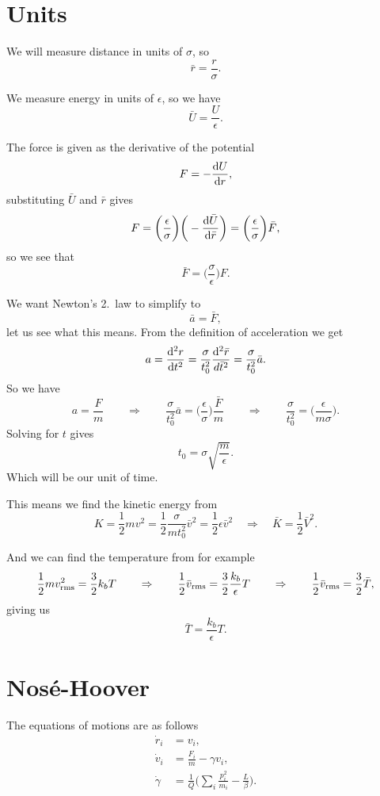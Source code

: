 \documentclass[a4paper, 11pt, notitlepage, english]{article}
\renewcommand{\d}{{\rm d}}
\newcommand{\To}{\quad\Rightarrow\quad}
\newcommand{\eps}{\epsilon}
\begin{document}
\section*{Units}

We will measure distance in units of $\sigma$, so
$$\bar{r} = \frac{r}{\sigma}.$$

We measure energy in units of $\eps$, so we have
$$\bar{U} = \frac{U}{\eps}.$$

The force is given as the derivative of the potential
$$F = -\frac{\d U}{\d r},$$
substituting $\bar U$ and $\bar r$ gives
$$F = \bigg(\frac{\eps}{\sigma}\bigg)\bigg(-\frac{\d \bar{U}}{\d \bar{r}}\bigg) = \bigg(\frac{\eps}{\sigma}\bigg)\bar{F},$$
so we see that
$$\bar{F} = \bigg(\frac{\sigma}{\eps}\bigg)F.$$

We want Newton's 2.\ law to simplify to
$$\bar{a} = \bar{F},$$
let us see what this means. From the definition of acceleration we get
$$a = \frac{\d^2 r}{\d t^2} = \frac{\sigma}{t_0^2} \frac{\d^2 \bar{r}}{d\bar{t}^2} = \frac{\sigma}{t_0^2}\bar{a}.$$ 
So we have
$$a = \frac{F}{m} \qquad \Rightarrow \qquad  \frac{\sigma}{t_0^2}\bar{a} = \bigg(\frac{\eps}{\sigma}\bigg)\frac{\bar{F}}{m} \qquad \Rightarrow \qquad \frac{\sigma}{t_0^2} = \bigg(\frac{\eps}{m\sigma}\bigg).$$
Solving for $t$ gives
$$t_0 = \sigma\sqrt{\frac{m}{\eps}}.$$
Which will be our unit of time.

This means we find the kinetic energy from
$$K = \frac{1}{2}mv^2 = \frac{1}{2}\frac{\sigma}{mt_0^2}\bar{v}^2 = \frac{1}{2}\eps \bar{v}^2 \quad \Rightarrow \quad \bar{K} = \frac{1}{2}\bar{V}^2.$$

And we can find the temperature from for example
$$\frac{1}{2}mv_{\rm rms}^2 = \frac{3}{2}k_b T \quad \To \quad \frac{1}{2}\bar{v}_{\rm rms} = \frac{3}{2}\frac{k_b}{\eps} T \quad \To \quad \frac{1}{2}\bar{v}_{\rm rms} = \frac{3}{2}\bar {T},$$
giving us
$$\bar{T} = \frac{k_b}{\eps}T.$$

\section*{Nosé-Hoover}

The equations of motions are as follows
\begin{align*}
\dot{r}_i &= v_i, \\
\dot{v}_i &= \frac{F_i}{m} - \gamma v_i, \\
\dot{\gamma} &= \frac{1}{Q}\bigg(\sum_{i} \frac{p_i^2}{m_i} - \frac{L}{\beta}\bigg).
\end{align*}
\end{document}
